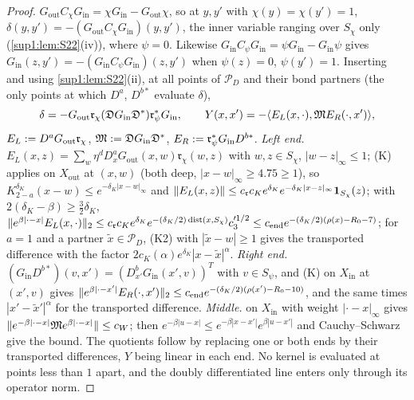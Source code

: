 \begin{proof}
$G_{\mathrm{out}}C_\chi G_{\mathrm{in}}=\chi G_{\mathrm{in}}-G_{\mathrm{out}}\chi$, so at $y,y'$ with $\chi(y)=\chi(y')=1$, $\delta(y,y')=-(G_{\mathrm{out}}C_\chi G_{\mathrm{in}})(y,y')$, the inner variable ranging over $S_\chi$ only (\cref{sup1:lem:S22}(iv)), where $\psi=0$. Likewise $G_{\mathrm{in}}C_\psi G_{\mathrm{in}}=\psi G_{\mathrm{in}}-G_{\mathrm{in}}\psi$ gives $G_{\mathrm{in}}(z,y')=-(G_{\mathrm{in}}C_\psi G_{\mathrm{in}})(z,y')$ when $\psi(z)=0$, $\psi(y')=1$. Inserting and using \cref{sup1:lem:S22}(ii), at all points of $\mathcal P_D$ and their bond partners (the only points at which $D^a$, $D^{b*}$ evaluate $\delta$),
\[
\delta=-G_{\mathrm{out}}\mathfrak r_\chi(\mathfrak DG_{\mathrm{in}}\mathfrak D^*)\mathfrak r_\psi^*G_{\mathrm{in}},\qquad Y(x,x')=-\langle E_L(x,\cdot),\mathfrak ME_R(\cdot,x')\rangle,
\]
$E_L:= D^aG_{\mathrm{out}}\mathfrak r_\chi$, $\mathfrak M:=\mathfrak DG_{\mathrm{in}}\mathfrak D^*$, $E_R:=\mathfrak r_\psi^*G_{\mathrm{in}}D^{b*}$. \emph{Left end.} $E_L(x,z)=\sum_w\eta^dD^a_xG_{\mathrm{out}}(x,w)\mathfrak r_\chi(w,z)$ with $w,z\in S_\chi$, $|w-z|_\infty\le1$; (K) applies on $X_{\mathrm{out}}$ at $(x,w)$ (both deep, $|x-w|_\infty\ge4.75\ge1$), so $K^{\delta_K}_{2-a}(x-w)\le e^{-\delta_K|x-w|_\infty}$ and $\lVert E_L(x,z)\rVert\le c_{\mathfrak r}c_Ke^{\delta_K}e^{-\delta_K|x-z|_\infty}\mathbf 1_{S_\chi}(z)$; with $2(\delta_K-\beta)\ge\frac32\delta_K$, $\lVert e^{\beta|\cdot-x|}E_L(x,\cdot)\rVert_2\le c_{\mathfrak r}c_Ke^{\delta_K}e^{-(\delta_K/2)\operatorname{dist}(x,S_\chi)}c_3'^{1/2}\le c_{\mathrm{end}}e^{-(\delta_K/2)(\rho(x)-R_0-7)}$; for $a=1$ and a partner $\tilde x\in\mathcal P_D$, (K2) with $|\tilde x-w|\ge1$ gives the transported difference with the factor $2c_K(\alpha)e^{\delta_K}|x-\tilde x|^\alpha$. \emph{Right end.} $(G_{\mathrm{in}}D^{b*})(v,x')=(D^b_{x'}G_{\mathrm{in}}(x',v))^T$ with $v\in S_\psi$, and (K) on $X_{\mathrm{in}}$ at $(x',v)$ gives $\lVert e^{\beta|\cdot-x'|}E_R(\cdot,x')\rVert_2\le c_{\mathrm{end}}e^{-(\delta_K/2)(\rho(x')-R_0-10)}$, and the same times $|x'-\tilde x'|^\alpha$ for the transported difference. \emph{Middle.}  on $X_{\mathrm{in}}$ with weight $|\cdot-x|_\infty$ gives $\lVert e^{-\beta|\cdot-x|}\mathfrak Me^{\beta|\cdot-x|}\rVert\le c_W$; then $e^{-\beta|u-x|}\le e^{-\beta|x-x'|}e^{\beta|u-x'|}$ and Cauchy--Schwarz give the bound. The quotients follow by replacing one or both ends by their transported differences, $Y$ being linear in each end. No kernel is evaluated at points less than $1$ apart, and the doubly differentiated line enters only through its operator norm.
\end{proof}

